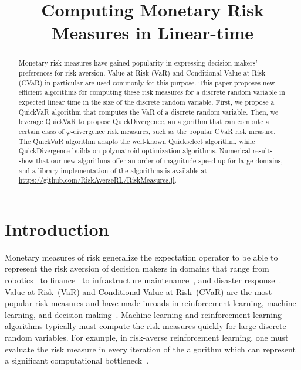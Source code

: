 \documentclass[10pt]{article} %
\title{Computing Monetary Risk Measures in Linear-time}
\renewcommand{\cite}{\citep}
\begin{document}
\maketitle

\begin{abstract}
Monetary risk measures have gained popularity in expressing decision-makers' preferences for risk aversion. Value-at-Risk (VaR) and Conditional-Value-at-Risk (CVaR) in particular are used commonly for this purpose. This paper proposes new efficient algorithms for computing these risk measures for a discrete random variable in expected linear time in the size of the discrete random variable. First, we propose a QuickVaR algorithm that computes the VaR of a discrete random variable. Then, we leverage QuickVaR to propose QuickDivergence, an algorithm that can compute a certain class of $\varphi$-divergence risk measures, such as the popular CVaR risk measure. The QuickVaR algorithm adapts the well-known Quickselect algorithm, while QuickDivergence builds on polymatroid optimization algorithms. Numerical results show that our new algorithms offer an order of magnitude speed up for large domains, and a library implementation of the algorithms is available at \url{https://github.com/RiskAverseRL/RiskMeasures.jl}.     
\end{abstract}

\section{Introduction}\label{sec:intro}

Monetary measures of risk generalize the expectation operator to be able to represent the risk aversion of decision makers in domains that range from robotics~\cite{akella2024risk,majumdar2020should,benrabah2024review} to finance~\cite{Follmer2016} to infrastructure maintenance~\cite{Inzunza2016}, and disaster response~\cite{Barahona2013}. Value-at-Risk~(VaR) and Conditional-Value-at-Risk~(CVaR) are the most popular risk measures and have made inroads in reinforcement learning, machine learning, and decision making~\cite{Petrik2024}. Machine learning and reinforcement learning algorithms typically must compute the risk measures quickly for large discrete random variables. For example, in risk-averse reinforcement learning, one must evaluate the risk measure in every iteration of the algorithm which can represent a significant computational bottleneck~\cite{Ho2021,Ho2018,Ho2022,Hau2023a,Hau2025}. 
\end{document}

